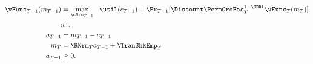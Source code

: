 \begin{equation*}\begin{gathered}\begin{aligned}
{\vFunc}_{T-1}(m_{T-1})  & = \max_{\cNrm_{T-1}} ~~ \util(c_{T-1}) + \Ex_{T-1} [\Discount \PermGroFac_{T}^{1-\CRRA}\vFunc_{T}(m_{T})] \label{eq:ConstrArt}
\\ & \mbox{s.t.}  \nonumber
\\ a_{T-1}  & = m_{T-1} - c_{T-1}
\\ m_{T}  & = \RNrm_{T} a_{T-1} + \TranShkEmp_{T}
\\ a_{T-1} & \geq  0 .
\end{aligned}\end{gathered}\end{equation*}
